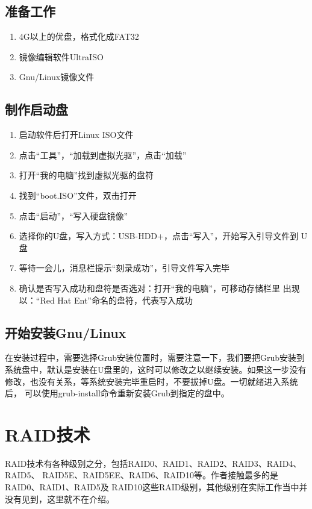 \section{准备工作}

\begin{enumerate}[itemsep=0pt,parsep=0pt]
\item 4G以上的优盘，格式化成FAT32
\item 镜像编辑软件UltraISO
\item Gnu/Linux镜像文件
\end{enumerate}

\section{制作启动盘}

\begin{enumerate}[itemsep=0pt,parsep=0pt]
\item 启动软件后打开Linux ISO文件
\item 点击“工具”，“加载到虚拟光驱”，点击“加载”
\item 打开“我的电脑”找到虚拟光驱的盘符 
\item 找到“boot.ISO”文件，双击打开
\item 点击“启动”，“写入硬盘镜像”
\item 选择你的U盘，写入方式：USB-HDD+，点击“写入”，开始写入引导文件到
  U盘
\item 等待一会儿，消息栏提示“刻录成功”，引导文件写入完毕
\item 确认是否写入成功和盘符是否选对：打开“我的电脑”，可移动存储栏里
  出现 以：“Red Hat Ent”命名的盘符，代表写入成功
\end{enumerate}

\section{开始安装Gnu/Linux}

在安装过程中，需要选择Grub安装位置时，需要注意一下，我们要把Grub安装到
系统盘中，默认是安装在U盘里的，这时可以修改之以继续安装。如果这一步没有
修改，也没有关系，等系统安装完毕重启时，不要拔掉U盘。一切就绪进入系统后，
可以使用grub-install命令重新安装Grub到指定的盘中。

\chapter{RAID技术}

RAID技术有各种级别之分，包括RAID0、RAID1、RAID2、RAID3、RAID4、RAID5、
RAID5E、RAID5EE、RAID6、RAID10等。作者接触最多的是RAID0、RAID1、RAID5及
RAID10这些RAID级别，其他级别在实际工作当中并没有见到，这里就不在介绍。

